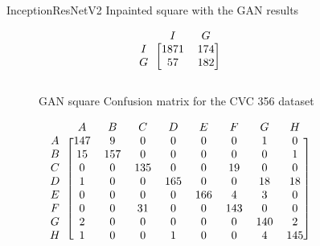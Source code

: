 \begin{figure}[h]
\caption{InceptionResNetV2 Inpainted square with  the GAN results}
\myfontsize
\caption*{\footnotesize \textmd{ \textbf{A}:{dyed-lifted-polyps} , \textbf{B}:{dyed-resection-margins} , \textbf{C}:{esophagitis} , \textbf{D}:{normal-cecum} , \textbf{E}:{normal-pylorus} , \textbf{F}:{normal-z-line} , \textbf{G}:{polyps} , \textbf{H}:{ulcerative-colitis} , \textbf{I}:{non-polyp}}}

\begin{subfigure}[b]{0.25\textwidth}
     
\[
\begin{blockarray}{ccc}
& I & G  \\
\begin{block}{c[cc]}
        I&1871 &  174\\
        G& 57 &  182\\
\end{block}
\end{blockarray}
 \]         

\caption{GAN square Confusion matrix for the CVC 356 dataset}
\label{mat:cvc356_CM_IRV2_GAN_SQUARE}
\end{subfigure}
\begin{subfigure}[b]{0.49\textwidth}  
\scriptsize     
\[
\begin{blockarray}{ccccccccc}
& A & B & C & D & E & F & G & H \\
\begin{block}{c[cccccccc]}
A&147 & 9 & 0 & 0 & 0 & 0 & 1 & 0\\
B& 15 & 157 & 0 & 0 & 0 & 0 & 0 & 1\\
C&  0 & 0 & 135 & 0 & 0 & 19 & 0 & 0\\
D&  1 & 0 & 0 & 165 & 0 & 0 & 18 & 18\\
E&  0 & 0 & 0 & 0 & 166 & 4 & 3 & 0\\
F&  0 & 0 & 31 & 0 & 0 & 143 & 0 & 0\\
G&  2 & 0 & 0 & 0 & 0 & 0 & 140 & 2\\
H&  1 & 0 & 0 & 1 & 0 & 0 & 4 & 145\\
\end{block}
\end{blockarray}
 \]        
        

\end{subfigure}
\end{figure}
